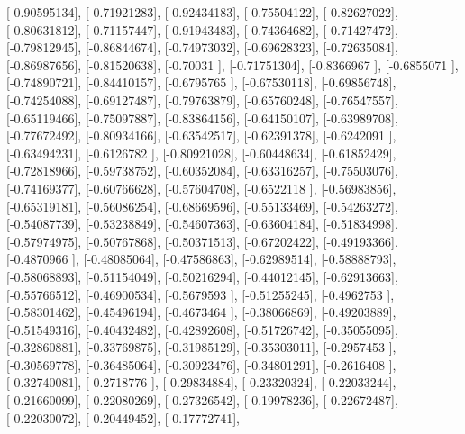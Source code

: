 \documentclass{article}
\begin{document}
       [-0.90595134],
       [-0.71921283],
       [-0.92434183],
       [-0.75504122],
       [-0.82627022],
       [-0.80631812],
       [-0.71157447],
       [-0.91943483],
       [-0.74364682],
       [-0.71427472],
       [-0.79812945],
       [-0.86844674],
       [-0.74973032],
       [-0.69628323],
       [-0.72635084],
       [-0.86987656],
       [-0.81520638],
       [-0.70031   ],
       [-0.71751304],
       [-0.8366967 ],
       [-0.6855071 ],
       [-0.74890721],
       [-0.84410157],
       [-0.6795765 ],
       [-0.67530118],
       [-0.69856748],
       [-0.74254088],
       [-0.69127487],
       [-0.79763879],
       [-0.65760248],
       [-0.76547557],
       [-0.65119466],
       [-0.75097887],
       [-0.83864156],
       [-0.64150107],
       [-0.63989708],
       [-0.77672492],
       [-0.80934166],
       [-0.63542517],
       [-0.62391378],
       [-0.6242091 ],
       [-0.63494231],
       [-0.6126782 ],
       [-0.80921028],
       [-0.60448634],
       [-0.61852429],
       [-0.72818966],
       [-0.59738752],
       [-0.60352084],
       [-0.63316257],
       [-0.75503076],
       [-0.74169377],
       [-0.60766628],
       [-0.57604708],
       [-0.6522118 ],
       [-0.56983856],
       [-0.65319181],
       [-0.56086254],
       [-0.68669596],
       [-0.55133469],
       [-0.54263272],
       [-0.54087739],
       [-0.53238849],
       [-0.54607363],
       [-0.63604184],
       [-0.51834998],
       [-0.57974975],
       [-0.50767868],
       [-0.50371513],
       [-0.67202422],
       [-0.49193366],
       [-0.4870966 ],
       [-0.48085064],
       [-0.47586863],
       [-0.62989514],
       [-0.58888793],
       [-0.58068893],
       [-0.51154049],
       [-0.50216294],
       [-0.44012145],
       [-0.62913663],
       [-0.55766512],
       [-0.46900534],
       [-0.5679593 ],
       [-0.51255245],
       [-0.4962753 ],
       [-0.58301462],
       [-0.45496194],
       [-0.4673464 ],
       [-0.38066869],
       [-0.49203889],
       [-0.51549316],
       [-0.40432482],
       [-0.42892608],
       [-0.51726742],
       [-0.35055095],
       [-0.32860881],
       [-0.33769875],
       [-0.31985129],
       [-0.35303011],
       [-0.2957453 ],
       [-0.30569778],
       [-0.36485064],
       [-0.30923476],
       [-0.34801291],
       [-0.2616408 ],
       [-0.32740081],
       [-0.2718776 ],
       [-0.29834884],
       [-0.23320324],
       [-0.22033244],
       [-0.21660099],
       [-0.22080269],
       [-0.27326542],
       [-0.19978236],
       [-0.22672487],
       [-0.22030072],
       [-0.20449452],
       [-0.17772741],
\end{document}

